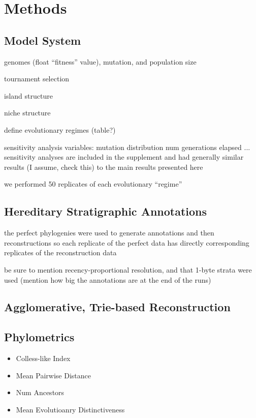 \section{Methods} \label{sec:methods}

\subsection{Model System}

genomes (float ``fitness'' value), mutation, and population size

tournament selection

island structure

niche structure

define evolutionary regimes (table?)

sensitivity analysis variables:
mutation distribution
num generations elapsed
... sensitivity analyses are included in the supplement and had generally similar results (I assume, check this) to the main results presented here

we performed 50 replicates of each evolutionary ``regime''

\subsection{Hereditary Stratigraphic Annotations}

the perfect phylogenies were used to generate annotations and then reconstructions so each replicate of the perfect data has directly corresponding replicates of the reconstruction data

be sure to mention recency-proportional resolution, and that 1-byte strata were used (mention how big the annotations are at the end of the runs)

\subsection{Agglomerative, Trie-based Reconstruction}

\subsection{Phylometrics}
\begin{itemize}
    \item Colless-like Index \citep{mirSoundCollesslikeBalance2018}
    \item Mean Pairwise Distance
    \item Num Ancestors
    \item Mean Evolutioanry Distinctiveness \citep{isaacMammalsEDGEConservation2007}
\end{itemize}


